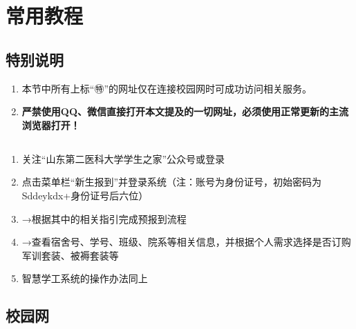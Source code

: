 \section[常用教程]{常用教程}

\subsection*{特别说明}
\begin{enumerate}
    \item 本节中所有上标“㊕”的网址仅在连接校园网时可成功访问相关服务。
    \item \textbf{严禁使用QQ、微信直接打开本文提及的一切网址，必须使用正常更新的主流浏览器打开！}
\end{enumerate}

\subsection[新生信息查询]{}
\label{freshman_query}
\begin{enumerate}
    \item 关注“山东第二医科大学学生之家”公众号或登录
    \item 点击菜单栏“新生报到”并登录系统（注：账号为身份证号，初始密码为Sddeykdx+身份证号后六位）
    \item →根据其中的相关指引完成预报到流程
    \item →查看宿舍号、学号、班级、院系等相关信息，并根据个人需求选择是否订购军训套装、被褥套装\footnotemark 等
    \item 智慧学工系统的操作办法同上
\end{enumerate}

\subsection[校园网]{校园网}
